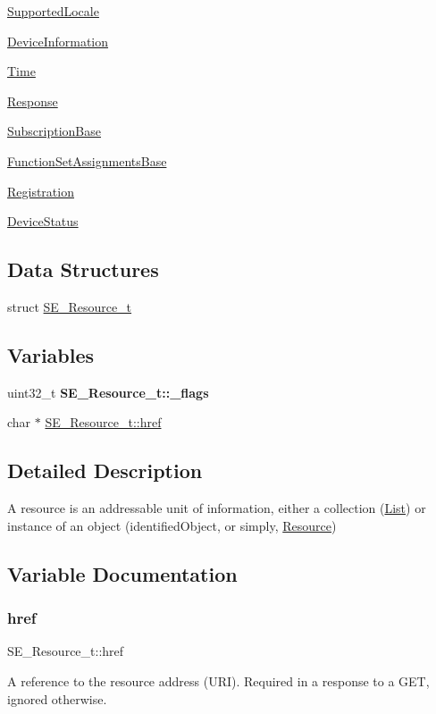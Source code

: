 \begin{DoxyCompactItemize}
\item 
\hyperlink{group__SupportedLocale}{Supported\+Locale}
\item 
\hyperlink{group__DeviceInformation}{Device\+Information}
\item 
\hyperlink{group__Time}{Time}
\item 
\hyperlink{group__Response}{Response}
\item 
\hyperlink{group__SubscriptionBase}{Subscription\+Base}
\item 
\hyperlink{group__FunctionSetAssignmentsBase}{Function\+Set\+Assignments\+Base}
\item 
\hyperlink{group__Registration}{Registration}
\item 
\hyperlink{group__DeviceStatus}{Device\+Status}
\end{DoxyCompactItemize}
\subsection*{Data Structures}
\begin{DoxyCompactItemize}
\item 
struct \hyperlink{structSE__Resource__t}{S\+E\+\_\+\+Resource\+\_\+t}
\end{DoxyCompactItemize}
\subsection*{Variables}
\begin{DoxyCompactItemize}
\item 
\mbox{\label{group__Resource_gae655fca5b3241deb31ebf016ed2017b6}} 
uint32\+\_\+t {\bfseries S\+E\+\_\+\+Resource\+\_\+t\+::\+\_\+flags}
\item 
char $\ast$ \hyperlink{group__Resource_gab28da8155327844e859d3d90bf37f2ec}{S\+E\+\_\+\+Resource\+\_\+t\+::href}
\end{DoxyCompactItemize}


\subsection{Detailed Description}
A resource is an addressable unit of information, either a collection (\hyperlink{structList}{List}) or instance of an object (identified\+Object, or simply, \hyperlink{structResource}{Resource}) 

\subsection{Variable Documentation}
\mbox{\label{group__Resource_gab28da8155327844e859d3d90bf37f2ec}} 
\subsubsection{\texorpdfstring{href}{href}}
{\footnotesize\ttfamily S\+E\+\_\+\+Resource\+\_\+t\+::href}

A reference to the resource address (U\+RI). Required in a response to a G\+ET, ignored otherwise. 